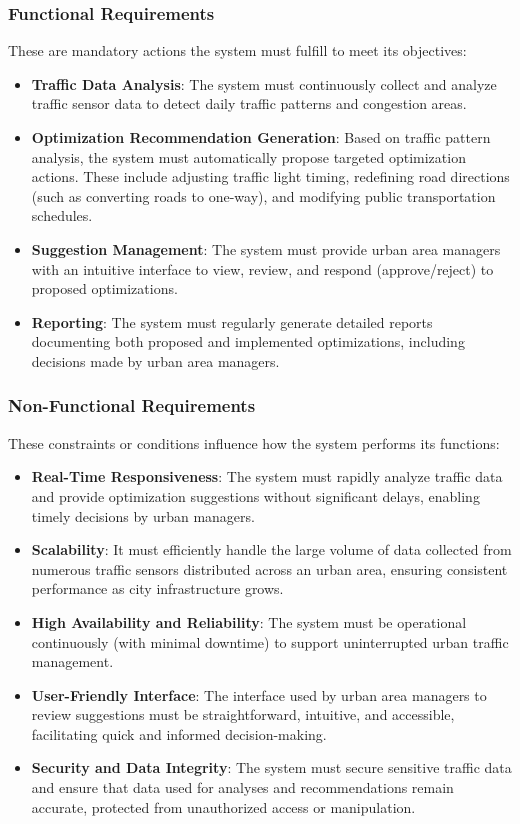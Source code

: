 \documentclass[a4paper,12pt]{article}
\begin{document}
\subsubsection{Functional Requirements}
These are mandatory actions the system must fulfill to meet its objectives:
\begin{itemize}
    \item \textbf{Traffic Data Analysis}: The system must continuously collect and analyze traffic sensor data to detect daily traffic patterns and congestion areas.
    \item \textbf{Optimization Recommendation Generation}: Based on traffic pattern analysis, the system must automatically propose targeted optimization actions. These include adjusting traffic light timing, redefining road directions (such as converting roads to one-way), and modifying public transportation schedules.
    \item \textbf{Suggestion Management}: The system must provide urban area managers with an intuitive interface to view, review, and respond (approve/reject) to proposed optimizations.
    \item \textbf{Reporting}: The system must regularly generate detailed reports documenting both proposed and implemented optimizations, including decisions made by urban area managers.
\end{itemize}

\subsubsection{Non-Functional Requirements}
These constraints or conditions influence how the system performs its functions:
\begin{itemize}
    \item \textbf{Real-Time Responsiveness}: The system must rapidly analyze traffic data and provide optimization suggestions without significant delays, enabling timely decisions by urban managers.
    \item \textbf{Scalability}: It must efficiently handle the large volume of data collected from numerous traffic sensors distributed across an urban area, ensuring consistent performance as city infrastructure grows.
    \item \textbf{High Availability and Reliability}: The system must be operational continuously (with minimal downtime) to support uninterrupted urban traffic management.
    \item \textbf{User-Friendly Interface}: The interface used by urban area managers to review suggestions must be straightforward, intuitive, and accessible, facilitating quick and informed decision-making.
    \item \textbf{Security and Data Integrity}: The system must secure sensitive traffic data and ensure that data used for analyses and recommendations remain accurate, protected from unauthorized access or manipulation.
\end{itemize}
\end{document}
